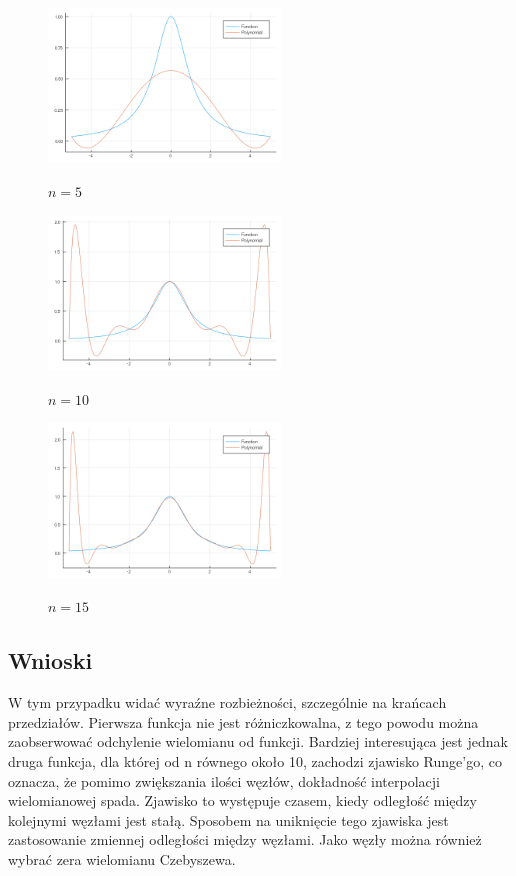 \documentclass[12pt]{article}
\begin{document}
	\begin{figure}[!htbp]
		\centering
		{\includegraphics[width=0.55\textwidth]{10.png}}
		\caption{$n=5$}
	\end{figure}	
	\begin{figure}[!htbp]
		\centering
		{\includegraphics[width=0.55\textwidth]{11.png}}
		\caption{$n=10$}
	\end{figure}		
	\begin{figure}[!htbp]
		\centering
		{\includegraphics[width=0.55\textwidth]{12.png}}
		\caption{$n=15$}
	\end{figure}
		
\subsection{Wnioski}
W tym przypadku widać wyraźne rozbieżności, szczególnie na krańcach przedziałów. Pierwsza funkcja nie jest różniczkowalna, z tego powodu można zaobserwować odchylenie wielomianu od funkcji. Bardziej interesująca jest jednak druga funkcja, dla której od n równego około 10, zachodzi zjawisko Runge'go, co oznacza, że pomimo zwiększania ilości węzłów, dokładność interpolacji wielomianowej spada. Zjawisko to występuje czasem, kiedy odległość między kolejnymi węzłami jest stałą. Sposobem na uniknięcie tego zjawiska jest zastosowanie zmiennej odległości między węzłami. Jako węzły można również wybrać zera wielomianu Czebyszewa.
\end{document}

